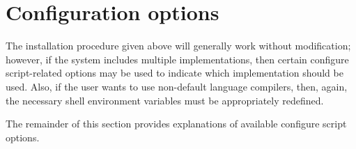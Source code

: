 \section{Configuration options}

The installation procedure given above will generally work without modification;
however, if the system includes multiple {\mpi} implementations, then certain
configure script-related options may be used to indicate which {\mpi}
implementation should be used. Also, if the user wants to use non-default
language compilers, then, again, the necessary shell environment variables must
be appropriately redefined.

The remainder of this section provides explanations of available configure script
options.



